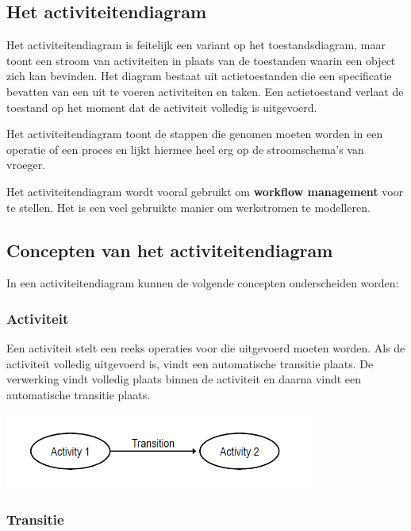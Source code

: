 \subsection{ Het activiteitendiagram}

Het activiteitendiagram is feitelijk een variant op het toestandsdiagram, maar toont een stroom van activiteiten in plaats van de toestanden waarin een object zich kan bevinden. Het diagram bestaat uit actietoestanden die een specificatie bevatten van een uit te voeren activiteiten en taken. Een actietoestand verlaat de toestand op het moment dat de activiteit volledig is uitgevoerd.

Het activiteitendiagram toont de stappen die genomen moeten worden in een operatie of een proces en lijkt hiermee heel erg op de stroomschema's van vroeger.

Het activiteitendiagram wordt vooral gebruikt om \textbf{workflow management} voor te stellen. Het is een veel gebruikte manier om werkstromen te modelleren.

\subsection{ Concepten van het activiteitendiagram}

In een activiteitendiagram kunnen de volgende concepten onderscheiden worden:

\subsubsection{Activiteit}

Een activiteit stelt een reeks operaties voor die uitgevoerd moeten worden. Als de activiteit volledig uitgevoerd is, vindt een automatische transitie plaats. De verwerking vindt volledig plaats binnen de activiteit en daarna vindt een automatische transitie plaats.


\begin{center}
\includegraphics[width=4in]{img/activity1}%
\end{center}

\subsubsection{Transitie}

